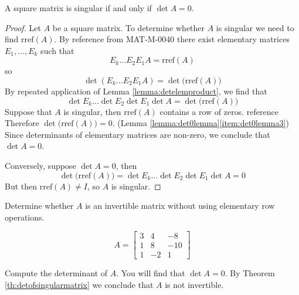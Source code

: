 \documentclass{ximera}
\begin{document}
\begin{theorem}\label{th:detofsingularmatrix}
A square matrix is singular if and only if $\det{A}=0$.
\end{theorem}
\begin{proof}
Let $A$ be a square matrix.  To determine whether $A$ is singular we need to find $\mbox{rref}(A)$.  By {\color{red}reference from MAT-M-0040} there exist elementary matrices $E_1,\ldots ,E_k$ such that 
$$E_k\ldots E_2E_1A=\mbox{rref}(A)$$
so
$$\det{(E_k\ldots E_2E_1A)}=\det{\big(\mbox{rref}(A)\big)}$$
By repeated application of Lemma \ref{lemma:detelemproduct}, we find that 
$$\det{E_k}\ldots \det{E_2}\det{E_1}\det{A}=\det{\big(\mbox{rref}(A)\big)}$$
Suppose that $A$ is singular, then $\mbox{rref}(A)$ contains a row of zeros. {\color{red}reference} Therefore $\det{\big(\mbox{rref}(A)\big)}=0$. (Lemma \ref{lemma:det0lemma}\ref{item:det0lemma3})  Since determinants of elementary matrices are non-zero, we conclude that $\det{A}=0$.

Conversely, suppose $\det{A}=0$, then
$$\det{\big(\mbox{rref}(A)\big)}=\det{E_k}\ldots \det{E_2}\det{E_1}\det{A}=0$$
But then $\mbox{rref}(A)\neq I$, so $A$ is singular.
\end{proof}
\begin{example} Determine whether $A$ is an invertible matrix without using elementary row operations.

$$A=\begin{bmatrix}3&4&-8\\1&8&-10\\1&-2&1\end{bmatrix}$$
\begin{explanation}
Compute the determinant of $A$.  You will find that $\det{A}=0$.  By Theorem \ref{th:detofsingularmatrix} we conclude that $A$ is not invertible.
\end{explanation}
\end{example}
\end{document}
